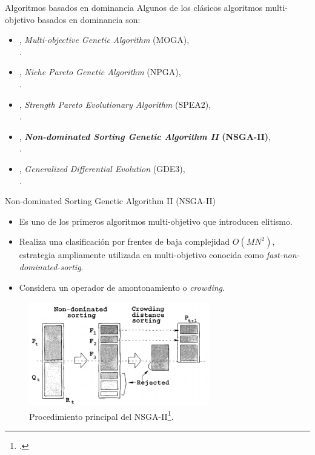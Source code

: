 \documentclass{beamer}
\begin{document}
\begin{frame}{Algoritmos basados en dominancia}
Algunos de los clásicos algoritmos multi-objetivo basados en dominancia son:
\begin{itemize}
\scriptsize
    \item \citeyear{Joel:MOGA}, \textit{Multi-objective Genetic Algorithm} (MOGA), \\ \citeauthor{Joel:MOGA}.
    \item \citeyear{Joel:NPGA}, \textit{Niche Pareto Genetic Algorithm} (NPGA), \\ \citeauthor{Joel:NPGA}.
    \item \citeyear{zitzler2001spea2}, \textit{Strength Pareto Evolutionary Algorithm} (SPEA2), \\ \citeauthor{zitzler2001spea2}.
    \item \citeyear{Joel:NSGAII},  \textbf{\textit{Non-dominated Sorting Genetic Algorithm II} (NSGA-II)}, \\ \citeauthor{Joel:NSGAII}.
    \item \citeyear{Joel:GDE3}, \textit{Generalized Differential Evolution} (GDE3), \\ \citeauthor{Joel:GDE3}.
\end{itemize}
\end{frame}


\begin{frame}{Non-dominated Sorting Genetic Algorithm II (NSGA-II)}
\begin{itemize}
\scriptsize
\item Es uno de los primeros algoritmos multi-objetivo que introducen elitismo.
\item Realiza una clasificación por frentes de baja complejidad $O(MN^2)$, estrategia ampliamente utilizada en multi-objetivo conocida como \textit{fast-non-dominated-sortig}.
\item Considera un operador de amontonamiento o \textit{crowding}. 
\end{itemize}

\begin{figure}[H]
\centering
\includegraphics[width=0.7\textwidth]{crowding_nsgaii.png}
\caption{\scriptsize Procedimiento principal del NSGA-II\footcite{Joel:NSGAII}.}
\end{figure}
\end{frame}
\end{document}
